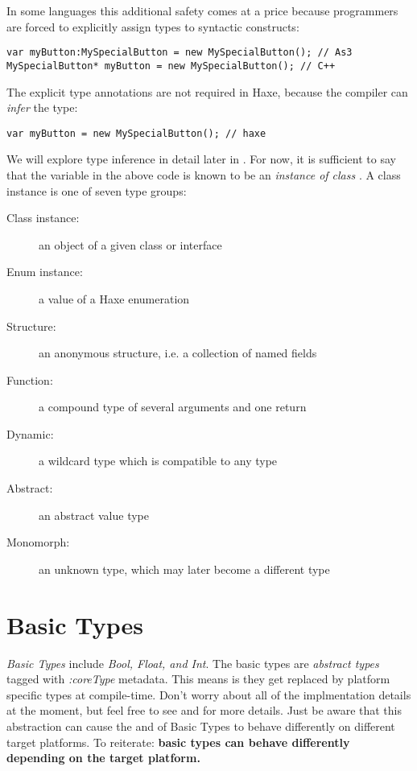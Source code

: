 \documentclass{haxe}
\begin{document}
In some languages this additional safety comes at a price because programmers are forced to explicitly assign types to syntactic constructs:

\begin{lstlisting}
var myButton:MySpecialButton = new MySpecialButton(); // As3
MySpecialButton* myButton = new MySpecialButton(); // C++ 
\end{lstlisting}
The explicit type annotations are not required in Haxe, because the compiler can \emph{infer} the type:

\begin{lstlisting}
var myButton = new MySpecialButton(); // haxe
\end{lstlisting}
We will explore type inference in detail later in . For now, it is sufficient to say that the variable  in the above code is known to be an \emph{instance of class} . A class instance is one of seven type groups:

\begin{description}
 \item[Class instance:] an object of a given class or interface
 \item[Enum instance:] a value of a Haxe enumeration
 \item[Structure:] an anonymous structure, i.e. a collection of named fields
 \item[Function:] a compound type of several arguments and one return
 \item[Dynamic:] a wildcard type which is compatible to any type
 \item[Abstract:] an abstract value type
 \item[Monomorph:] an unknown type, which may later become a different type
\end{description}



\section{Basic Types}
\label{types-basic-types}


\emph{Basic Types} include \emph{Bool, Float, and Int}.  The basic types are \emph{abstract types} tagged with \emph{:coreType} metadata.  This means is they get replaced by platform specific types at compile-time.  Don't worry about all of the implmentation details at the moment, but feel free to see  and  for more details.  Just be aware that this abstraction can cause the  and  of Basic Types to behave differently on different target platforms.  To reiterate: \textbf{basic types can behave differently depending on the target platform.}
\end{document}
